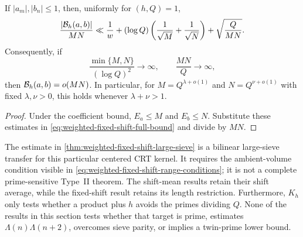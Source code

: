 \begin{corollary}
\label{cor:weighted-fixed-shift-bounded}
If $|a_m|,|b_n|\leq1$, then, uniformly for $(h,Q)=1$,
\begin{equation}\label{eq:weighted-fixed-shift-normalized-bounded}
 \frac{|\mathcal B_h(a,b)|}{MN}
 \ll
 \frac1w
 +(\log Q)\left(\frac1{\sqrt M}+\frac1{\sqrt N}\right)
 +\sqrt{\frac Q{MN}}.
\end{equation}
Consequently, if
\begin{equation}\label{eq:weighted-fixed-shift-range-conditions}
 \frac{\min\{M,N\}}{(\log Q)^2}\longrightarrow\infty,
 \qquad
 \frac{MN}{Q}\longrightarrow\infty,
\end{equation}
then $\mathcal B_h(a,b)=o(MN)$.  In particular, for
$M=Q^{\lambda+o(1)}$ and $N=Q^{\nu+o(1)}$ with fixed
$\lambda,\nu>0$, this holds whenever $\lambda+\nu>1$.
\end{corollary}

\begin{proof}
Under the coefficient bound, $E_a\leq M$ and $E_b\leq N$.  Substitute
these estimates in \eqref{eq:weighted-fixed-shift-full-bound} and divide by
$MN$.
\end{proof}

\begin{remark}
\label{rem:weighted-not-complete-type-II}
The estimate in \cref{thm:weighted-fixed-shift-large-sieve} is a bilinear
large-sieve transfer for this particular centered CRT kernel.  It requires
the ambient-volume condition visible in
\eqref{eq:weighted-fixed-shift-range-conditions}; it is not a complete
prime-sensitive Type~II theorem.  The shift-mean results retain their shift
average, while the fixed-shift result retains its length restriction.
Furthermore, $K_h$ only tests whether a product plus $h$ avoids the primes
dividing $Q$.  None of the results in this section tests whether that target
is prime, estimates $\Lambda(n)\Lambda(n+2)$, overcomes sieve parity, or
implies a twin-prime lower bound.
\end{remark}

